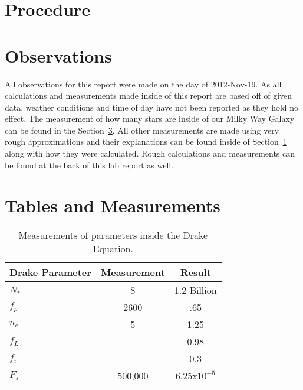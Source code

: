\documentclass{article}
\begin{document}

\section{Procedure}
\label{sec:proc}





\section{Observations}

All observations for this report were made on the day of 2012-Nov-19. As all calculations and measurements made inside of this report are based off of
given data, weather conditions and time of day have not been reported as they hold no effect. The measurement of how many stars are inside of our
Milky Way Galaxy can be found in the Section~\ref{sec:tnm}. All other measurements are made using very rough approximations and their explanations
can be found inside of Section~\ref{sec:proc} along with how they were calculated. Rough calculations and measurements can be found at the back of
this lab report as well.


\section{Tables and Measurements}
\label{sec:tnm}

\begin{table}[h]
\begin{center}
\begin{tabular}{l c c}
\hline
Drake Parameter & Measurement & Result\\
\hline
\hline
${N}_{*}$ & 8 & 1.2 Billion\\
${f}_{p}$ & 2600 & .65\\ 
${n}_{e}$ & 5 & 1.25\\
${f}_{L}$ & - & 0.98\\
${f}_{i}$ & - & 0.3\\
${F}_{s}$ & 500,000 & 6.25x${10}^{-5}$\\
\hline
\end{tabular}
\end{center}
\caption{Measurements of parameters inside the Drake Equation.\label{tab:drake}}
\end{table}
\end{document}
